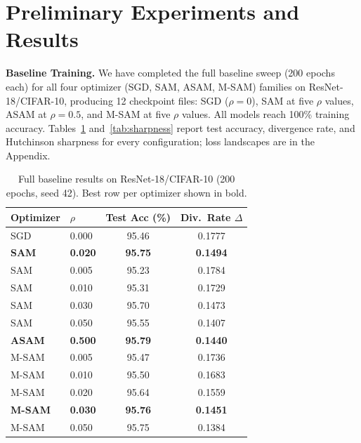 \documentclass{article}
\begin{document}
\section{Preliminary Experiments and Results}

\textbf{Baseline Training.}
We have completed the full baseline sweep (200 epochs each) for all four optimizer (SGD, SAM, ASAM, M-SAM) families on ResNet-18/CIFAR-10, producing 12 checkpoint files: SGD ($\rho{=}0$), SAM at five $\rho$ values, ASAM at $\rho{=}0.5$, and M-SAM at five $\rho$ values.  All models reach 100\% training accuracy.  Tables~\ref{tab:baseline_full} and~\ref{tab:sharpness} report test accuracy, divergence rate, and Hutchinson sharpness for every configuration; loss landscapes are in the Appendix.

\begin{table}[H]
\centering\scriptsize
\begin{minipage}[t]{0.45\textwidth}
\centering
\caption{Full baseline results on ResNet-18/CIFAR-10 (200 epochs, seed 42). Best row per optimizer shown in bold.}
\label{tab:baseline_full}
\begin{tabular}{llcc}
\toprule
Optimizer & $\rho$ & Test Acc (\%) & Div.\ Rate $\Delta$ \\
\midrule
SGD      & 0.000 & 95.46          & 0.1777 \\
\midrule
\textbf{SAM} & \textbf{0.020} & \textbf{95.75} & \textbf{0.1494} \\
SAM      & 0.005 & 95.23          & 0.1784 \\
SAM      & 0.010 & 95.31          & 0.1729 \\
SAM      & 0.030 & 95.70          & 0.1473 \\
SAM      & 0.050 & 95.55          & 0.1407 \\
\midrule
\textbf{ASAM} & \textbf{0.500} & \textbf{95.79} & \textbf{0.1440} \\
\midrule
M-SAM    & 0.005 & 95.47          & 0.1736 \\
M-SAM    & 0.010 & 95.50          & 0.1683 \\
M-SAM    & 0.020 & 95.64          & 0.1559 \\
\textbf{M-SAM} & \textbf{0.030} & \textbf{95.76} & \textbf{0.1451} \\
M-SAM    & 0.050 & 95.75          & 0.1384 \\
\bottomrule
\end{tabular}
\end{minipage}\hfill
\begin{minipage}[t]{0.45\textwidth}

\end{minipage}
\end{table}
\end{document}
